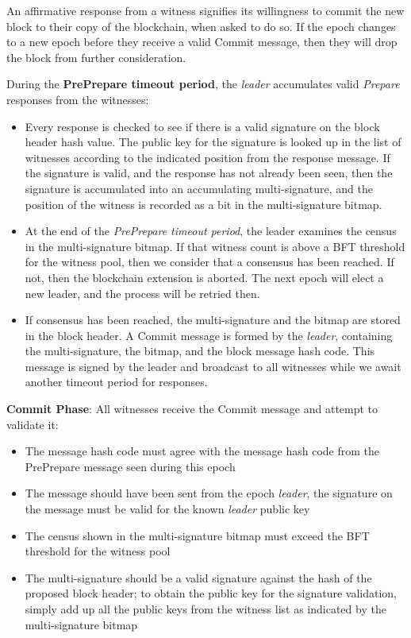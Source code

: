 \documentclass[a4paper, 10pt, conference]{ieeeconf}
\begin{document}
\begin{itemize}
{	\item{An affirmative response from a witness signifies its willingness to commit the new block to their copy of the blockchain, when asked to do so. If the epoch changes to a new epoch before they receive a valid Commit message, then they will drop the block from further consideration.} 

	\item{During the \textbf{PrePrepare timeout period}, the \textit{leader} accumulates valid \textit{Prepare} responses from the witnesses:

		\begin{itemize}
			\item {Every response is checked to see if there is a valid signature on the block header hash value. The public key for the signature is looked up in the list of witnesses according to the indicated position from the response message. If the signature is valid, and the response has not already been seen, then the signature is accumulated into an accumulating multi-signature, and the position of the witness is recorded as a bit in the multi-signature bitmap.} 

			\item {At the end of the \textit{PrePrepare timeout period}, the leader examines the census in the multi-signature bitmap. If that witness count is above a BFT threshold for the witness pool, then we consider that a consensus has been reached. If not, then the blockchain extension is aborted. The next epoch will elect a new leader, and the process will be retried then.}

			\item {If consensus has been reached, the multi-signature and the bitmap are stored in the block header. A Commit message is formed by the \textit{leader}, containing the multi-signature, the bitmap, and the block message hash code. This message is signed by the leader and broadcast to all witnesses while we await another timeout period for responses.}
		\end{itemize}}

	\item {\textbf{Commit Phase}: All witnesses receive the Commit message and attempt to validate it:

		\begin{itemize}
			\item {The message hash code must agree with the message hash code from the PrePrepare message seen during this epoch}
		\item{The message should have been sent from the epoch \textit{leader}, the signature on the message must be valid for the known \textit{leader} public key}
			\item{The census shown in the multi-signature bitmap must exceed the BFT threshold for the witness pool}
			\item{The multi-signature should be a valid signature against the hash of the proposed block header; to obtain the public key for the signature validation, simply add up all the public keys from the witness list as indicated by the multi-signature bitmap}
		\end{itemize}

}}
\end{itemize}
\end{document}
